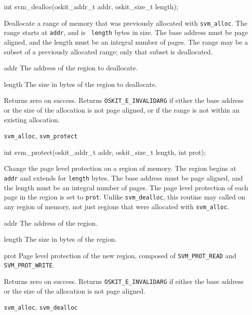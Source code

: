 \begin{apisyn}

	\funcproto int svm_dealloc(oskit_addr_t addr, oskit_size_t length);
\end{apisyn}
\begin{apidesc}
	Deallocate a range of memory that was previously allocated with
	{\tt svm_alloc}. The range starts at {\tt addr}, and is {\tt
	length} bytes in size. The base address must be page aligned, and
	the length must be an integral number of pages. The range may be a
	subset of a previously allocated range; only that subset is
	deallocated. 
\end{apidesc}
\begin{apiparm}
	\item[addr]
		The address of the region to deallocate. 
	\item[length]
		The size in bytes of the region to deallocate.
\end{apiparm}
\begin{apiret}
	Returns zero on success. Returns {\tt OSKIT_E_INVALIDARG} if either
	the base address or the size of the allocation is not page aligned,
	or if the range is not within an existing allocation.
\end{apiret}
\begin{apirel}
	{\tt svm_alloc}, {\tt svm_protect}
\end{apirel}


\begin{apisyn}

	\funcproto int svm_protect(oskit_addr_t addr,
                                   oskit_size_t length, int prot);
\end{apisyn}
\begin{apidesc}
	Change the page level protection on a region of memory. The region
	begins at {\tt addr} and extends for {\tt length} bytes. The base
	address must be page aligned, and the length must be an integral
	number of pages. The page level protection of each page in the
	region is set to {\tt prot}. Unlike {\tt svm_dealloc}, this routine
	may called on any region of memory, not just regions that were
	allocated with {\tt svm_alloc}. 
\end{apidesc}
\begin{apiparm}
	\item[addr]
		The address of the region.
	\item[length]
		The size in bytes of the region.
	\item[prot]
		Page level protection of the new region, composed of
		{\tt SVM_PROT_READ} and {\tt SVM_PROT_WRITE}.
\end{apiparm}
\begin{apiret}
	Returns zero on success. Returns {\tt OSKIT_E_INVALIDARG} if either
	the base address or the size of the allocation is not page aligned.
\end{apiret}
\begin{apirel}
	{\tt svm_alloc}, {\tt svm_dealloc}
\end{apirel}
